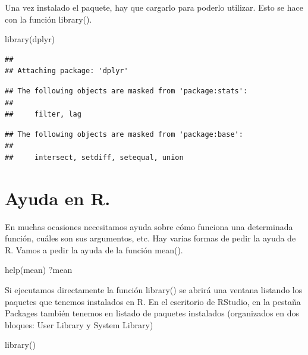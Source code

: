 \documentclass[
]{book}
\newenvironment{Shaded}{\begin{snugshade}}{\end{snugshade}}
\newcommand{\FunctionTok}[1]{\textcolor[rgb]{0.00,0.00,0.00}{#1}}
\newcommand{\NormalTok}[1]{#1}
\begin{document}
Una vez instalado el paquete, hay que cargarlo para poderlo utilizar. Esto se hace con la función library().

\begin{Shaded}
\begin{Highlighting}[]
\FunctionTok{library}\NormalTok{(dplyr)}
\end{Highlighting}
\end{Shaded}

\begin{verbatim}
## 
## Attaching package: 'dplyr'
\end{verbatim}

\begin{verbatim}
## The following objects are masked from 'package:stats':
## 
##     filter, lag
\end{verbatim}

\begin{verbatim}
## The following objects are masked from 'package:base':
## 
##     intersect, setdiff, setequal, union
\end{verbatim}

\hypertarget{ayuda-en-r.}{%
\section{Ayuda en R.}\label{ayuda-en-r.}}

En muchas ocasiones necesitamos ayuda sobre cómo funciona una determinada función, cuáles son sus argumentos, etc. Hay varias formas de pedir la ayuda de R. Vamos a pedir la ayuda de la función mean().

\begin{Shaded}
\begin{Highlighting}[]
\FunctionTok{help}\NormalTok{(mean)}
\NormalTok{?mean}
\end{Highlighting}
\end{Shaded}

Si ejecutamos directamente la función library() se abrirá una ventana listando los paquetes que tenemos instalados en R. En el escritorio de RStudio, en la pestaña Packages también tenemos en listado de paquetes instalados (organizados en dos bloques: User Library y System Library)

\begin{Shaded}
\begin{Highlighting}[]
\FunctionTok{library}\NormalTok{()}
\end{Highlighting}
\end{Shaded}
\end{document}
